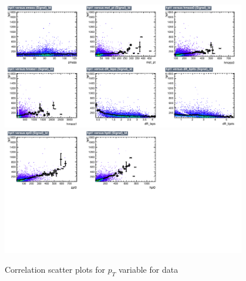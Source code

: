 \begin{figure}[!htb]%
\centering
\includegraphics[width=0.95\textwidth]{figures/CRDY/dataset/plots/correlationscatter_hpt1__Id_c1.pdf}
\includegraphics[width=0.95\textwidth]{figures/CRDY/dataset/plots/correlationscatter_hpt1__Id_c2.pdf}
\caption{ Correlation scatter plots for \HBB $p_{T}$  variable for data}%
\label{fig:correlations_CRDY_hpt1_S}                                                       
\end{figure}



